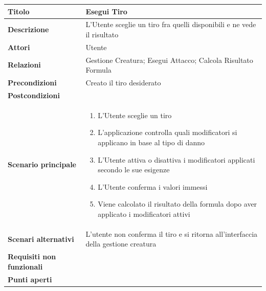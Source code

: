 \documentclass[a4paper, 11pt]{article}
\begin{document}
\begin{center}
\begin{tabular}{ |p{5cm}|p{9.5cm}|  }
\hline
\textbf{Titolo} & Esegui Tiro \\
\hline
\textbf{Descrizione} & L'Utente sceglie un tiro fra quelli disponibili e ne vede il risultato \\
\hline
\textbf{Attori} & Utente \\
\hline
\textbf{Relazioni} & Gestione Creatura; Esegui Attacco; Calcola Risultato Formula \\\hline
\textbf{Precondizioni} & Creato il tiro desiderato \\
\hline
\textbf{Postcondizioni} & \\
\hline
\textbf{Scenario principale} & 
\begin{enumerate}
    \item L'Utente sceglie un tiro
    \item L'applicazione controlla quali modificatori si applicano in base al tipo di danno
    \item L'Utente attiva o disattiva i modificatori applicati secondo le sue esigenze
    \item L'Utente conferma i valori immessi
    \item Viene calcolato il risultato della formula dopo aver applicato i modificatori attivi
\end{enumerate}\\
\hline
\textbf{Scenari alternativi} & L'utente non conferma il tiro e si ritorna all'interfaccia della gestione creatura\\
\hline
\textbf{Requisiti non funzionali} & \\
\hline
\textbf{Punti aperti} & \\
\hline
\end{tabular}

\vspace{3em}


\end{center}
\end{document}

